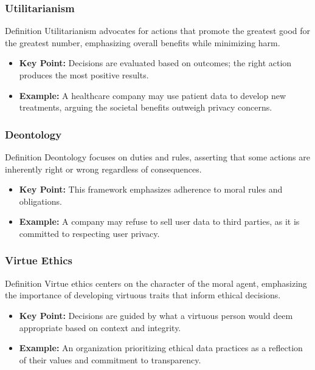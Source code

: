 \documentclass[aspectratio=169]{beamer}
\begin{document}
\begin{frame}[fragile]
    \frametitle{Utilitarianism}
    \begin{block}{Definition}
        Utilitarianism advocates for actions that promote the greatest good for the greatest number, emphasizing overall benefits while minimizing harm.
    \end{block}
    \begin{itemize}
        \item \textbf{Key Point:} Decisions are evaluated based on outcomes; the right action produces the most positive results.
        \item \textbf{Example:} A healthcare company may use patient data to develop new treatments, arguing the societal benefits outweigh privacy concerns.
    \end{itemize}
\end{frame}

\begin{frame}[fragile]
    \frametitle{Deontology}
    \begin{block}{Definition}
        Deontology focuses on duties and rules, asserting that some actions are inherently right or wrong regardless of consequences.
    \end{block}
    \begin{itemize}
        \item \textbf{Key Point:} This framework emphasizes adherence to moral rules and obligations.
        \item \textbf{Example:} A company may refuse to sell user data to third parties, as it is committed to respecting user privacy.
    \end{itemize}
\end{frame}

\begin{frame}[fragile]
    \frametitle{Virtue Ethics}
    \begin{block}{Definition}
        Virtue ethics centers on the character of the moral agent, emphasizing the importance of developing virtuous traits that inform ethical decisions.
    \end{block}
    \begin{itemize}
        \item \textbf{Key Point:} Decisions are guided by what a virtuous person would deem appropriate based on context and integrity.
        \item \textbf{Example:} An organization prioritizing ethical data practices as a reflection of their values and commitment to transparency.
    \end{itemize}
\end{frame}
\end{document}
